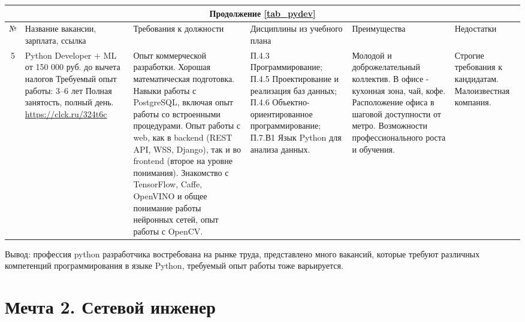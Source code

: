 \documentclass[14pt]{extreport}
\begin{document}
\begin{landscape}
\begin{table}[H]
	\begin{tabular}{|c|p{3.3cm}|p{6cm}|p{4.7cm}|p{5.5cm}|p{3.5cm}|}
	\multicolumn{6}{c}{Продолжение \ref{tab_pydev}} \\
	\hline № & {Название вакансии, зарплата, ссылка} & {Требования к должности} & {Дисциплины из учебного плана} & {Преимущества} & {Недостатки} \\
 	\hline 5 & {Python Developer + ML
от 150 000 руб. до вычета налогов
Требуемый опыт работы: 3–6 лет
Полная занятость, полный день. \url{https://clck.ru/324t6c}} & {Опыт коммерческой разработки.
Хорошая математическая подготовка.
Навыки работы с PostgreSQL, включая опыт работы со встроенными процедурами.
Опыт работы с web, как в backend (REST API, WSS, Django), так и во frontend (второе на уровне понимания).
Знакомство с TensorFlow, Caffe, OpenVINO и общее понимание работы нейронных сетей, опыт работы с OpenCV.} & {П.4.3 Программирование;
П.4.5 Проектирование и реализация баз данных;
П.4.6 Объектно-ориентированное программирование;
П.7.В1 Язык Python для анализа данных.} & {Молодой и доброжелательный коллектив.
В офисе - кухонная зона, чай, кофе.
Расположение офиса в шаговой доступности от метро.
Возможности профессионального роста и обучения.} & {Строгие требования к кандидатам. Малоизвестная компания.} \\
	\hline
	\end{tabular}
\end{table}

Вывод: профессия python разработчика востребована на рынке труда, представлено много вакансий, которые требуют различных компетенций программирования в языке Python, требуемый опыт работы тоже варьируется.

\section{Мечта 2. Сетевой инженер}


\end{landscape}
\end{document}
